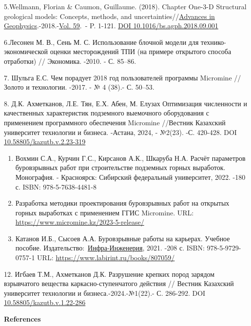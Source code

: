 5.Wellmann, Florian \& Caumon, Guillaume. (2018). Chapter One-3-D
Structural geological models: Concepts, methods, and
uncertainties//\href{https://www.sciencedirect.com/bookseries/advances-in-geophysics}{Advances
in
Geophysics}.-2018.-\href{https://www.sciencedirect.com/bookseries/advances-in-geophysics/vol/59/suppl/C}{Vol.
59}.~- P. 1-121.
\href{http://dx.doi.org/10.1016/bs.agph.2018.09.001}{DOI
10.1016/bs.agph.2018.09.001} \hl{}

6.Лесонен М. В., Сень М. С. Использование блочной модели для
технико-экономической оценки месторождений ТПИ (на примере открытого
способа отработки) // Экономика. -2010. - С. 85--86.

7. Шульга Е.С. Чем порадует 2018 год пользователей программы Micromine
// Золото и технологии. -2017. - № 4 (38).- С. 50--53.

8. Д.К. Ахметканов, Л.Е. Тян, Е.Х. Абен, М. Елузах Оптимизация
численности и качественных характеристик подземного выемочного
оборудования с применением программного обеспечения Micromine //Вестник
Казахский университет технологии и бизнеса. -Астана, 2024, - №2(23). -С.
420-428. DOI
\href{https://doi.org/10.58805/kazutb.v.2.23-319}{10.58805/kazutb.v.2.23-319}

\begin{enumerate}
\def\labelenumi{\arabic{enumi}.}
\item
  Вохмин С.А., Курчин Г.С., Кирсанов А.К., Шкаруба Н.А. Расчёт
  параметров буровзрывных работ при строительстве подземных горных
  выработок. Монография. - Красноярск: Сибирский федеральный
  университет, 2022. -180 с. ISBN: 978-5-7638-4481-8
\item
  Разработка методики проектирования буровзрывных работ на открытых
  горных выработках с применением ГГИС Micromine. URL:
  \url{https://www.micromine.kz/2023-5-release/}
\item
  Катанов И.Б., Сысоев А.А. Буровзрывные работы на карьерах. Учебное
  пособие.
  Издательство:~\href{https://www.labirint.ru/pubhouse/2357/}{Инфра-Инженерия},
  2021. -208 с. ISBN: 978-5-9729-0757-1 URL:
  \url{https://www.labirint.ru/books/807059/}
\end{enumerate}

12. Игбаев Т.М., Ахметканов Д.К. Разрушение крепких пород зарядом
взрывчатого вещества каркасно-ступенчатого действия // Вестник Казахский
университет технологии и бизнеса.-2024.-№1(22).- С. 286-292. DOI
\href{https://doi.org/10.58805/kazutb.v.1.22-286}{10.58805/kazutb.v.1.22-286}

{\bfseries References}

